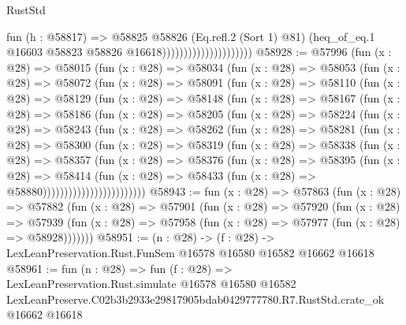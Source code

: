 \begin{lexlean}{RustStd}
\begin{coremodule}
                                          fun (h : @58817) =>
                                          @58825
                                            @58826
                                            (Eq.refl.{2} (Sort 1) @81)
                                            (heq_of_eq.{1}
                                              @16603
                                              @58823
                                              @58826
                                              @16618)))))))))))))))))))))
@58928 := @57996
    (fun (x : @28) =>
    @58015
      (fun (x : @28) =>
      @58034
        (fun (x : @28) =>
        @58053
          (fun (x : @28) =>
          @58072
            (fun (x : @28) =>
            @58091
              (fun (x : @28) =>
              @58110
                (fun (x : @28) =>
                @58129
                  (fun (x : @28) =>
                  @58148
                    (fun (x : @28) =>
                    @58167
                      (fun (x : @28) =>
                      @58186
                        (fun (x : @28) =>
                        @58205
                          (fun (x : @28) =>
                          @58224
                            (fun (x : @28) =>
                            @58243
                              (fun (x : @28) =>
                              @58262
                                (fun (x : @28) =>
                                @58281
                                  (fun (x : @28) =>
                                  @58300
                                    (fun (x : @28) =>
                                    @58319
                                      (fun (x : @28) =>
                                      @58338
                                        (fun (x : @28) =>
                                        @58357
                                          (fun (x : @28) =>
                                          @58376
                                            (fun (x : @28) =>
                                            @58395
                                              (fun (x : @28) =>
                                              @58414
                                                (fun (x : @28) =>
                                                @58433
                                                  (fun (x : @28) => @58880))))))))))))))))))))))))
@58943 := fun (x : @28) =>
  @57863
    (fun (x : @28) =>
    @57882
      (fun (x : @28) =>
      @57901
        (fun (x : @28) =>
        @57920
          (fun (x : @28) =>
          @57939 (fun (x : @28) => @57958 (fun (x : @28) => @57977 (fun (x : @28) => @58928)))))))
@58951 := (n : @28) ->
  (f : @28) -> LexLeanPreservation.Rust.FunSem @16578 @16580 @16582 @16662 @16618
@58961 := fun (n : @28) =>
  fun (f : @28) =>
  LexLeanPreservation.Rust.simulate
    @16578
    @16580
    @16582
    LexLeanPreserve.C02b3b2933e29817905bdab0429777780.R7.RustStd.crate_ok
    @16662
    @16618
\end{coremodule}
\end{lexlean}
